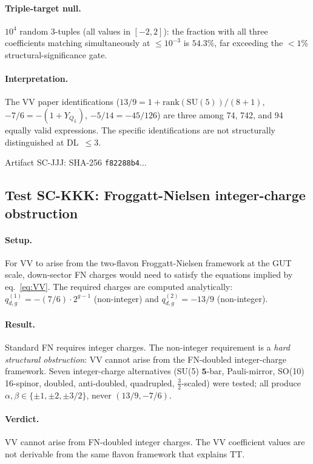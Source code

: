 \documentclass[11pt]{article}
\theoremstyle{remark}
\begin{document}
\paragraph{Triple-target null.}
$10^4$ random 3-tuples (all values in $[-2,2]$): the fraction with all three
coefficients matching simultaneously at $\leq10^{-3}$ is $\mathbf{54.3\%}$,
far exceeding the $<1\%$ structural-significance gate.

\paragraph{Interpretation.}
The VV paper identifications
($13/9 = 1 + \mathrm{rank}(\mathrm{SU}(5))/(8+1)$,
$-7/6 = -(1+Y_{Q_L})$,
$-5/14 = -45/126$)
are three among 74, 742, and 94 equally valid expressions.
The specific identifications are not structurally distinguished at DL~$\leq3$.

Artifact SC-JJJ: SHA-256 \texttt{f82288b4}$\ldots$

\subsection{Test SC-KKK: Froggatt-Nielsen integer-charge obstruction}
\label{sec:kkk}

\paragraph{Setup.}
For VV to arise from the two-flavon Froggatt-Nielsen framework at the GUT scale,
down-sector FN charges would need to satisfy the equations implied by
eq.~\eqref{eq:VV}.  The required charges are computed analytically:
$q_{d,g}^{(1)} = -(7/6)\cdot 2^{g-1}$ (non-integer) and
$q_{d,g}^{(2)} = -13/9$ (non-integer).

\paragraph{Result.}
Standard FN requires integer charges.  The non-integer requirement is a
\emph{hard structural obstruction}: VV cannot arise from the FN-doubled
integer-charge framework.
Seven integer-charge alternatives (SU(5) $\mathbf{5}$-bar, Pauli-mirror,
SO(10) 16-spinor, doubled, anti-doubled, quadrupled, $\tfrac{3}{2}$-scaled)
were tested; all produce $\alpha,\beta\in\{\pm1,\pm2,\pm3/2\}$, never
$(13/9,-7/6)$.

\paragraph{Verdict.}
VV cannot arise from FN-doubled integer charges.  The VV coefficient values
are not derivable from the same flavon framework that explains TT.
\end{document}

